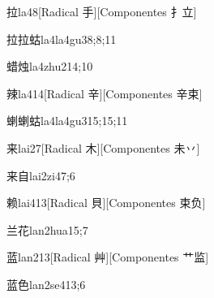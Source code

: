 \begin{verbete}{拉}{la4}{8}[Radical 手][Componentes 扌立]
\end{verbete}

\begin{verbete}{拉拉蛄}{la4la4gu3}{8;8;11}
\end{verbete}

\begin{verbete}{蜡烛}{la4zhu2}{14;10}
\end{verbete}

\begin{verbete}{辣}{la4}{14}[Radical 辛][Componentes 辛束]
\end{verbete}

\begin{verbete}{蝲蝲蛄}{la4la4gu3}{15;15;11}
\end{verbete}

\begin{verbete}{来}{lai2}{7}[Radical 木][Componentes 未丷]
\end{verbete}

\begin{verbete}{来自}{lai2zi4}{7;6}
\end{verbete}

\begin{verbete}{赖}{lai4}{13}[Radical 貝][Componentes 束负]
\end{verbete}

\begin{verbete}{兰花}{lan2hua1}{5;7}
\end{verbete}

\begin{verbete}{蓝}{lan2}{13}[Radical 艸][Componentes 艹监]
\end{verbete}

\begin{verbete}{蓝色}{lan2se4}{13;6}
\end{verbete}

